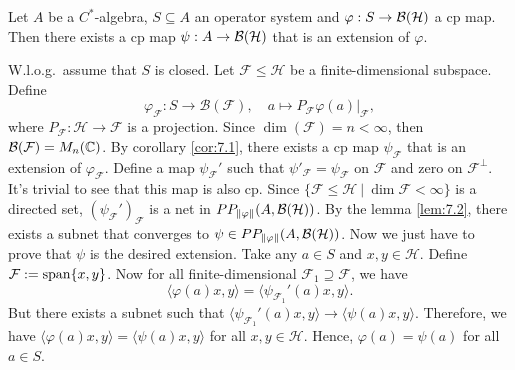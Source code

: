 \begin{theorem}
    Let $A$ be a $C^*$-algebra, $S \subseteq A$ an operator system and $\varphi: S \to \operatorname{\mathcal{B} (\mathcal{H})}$ a cp map.
    Then there exists a cp map $\psi: A \to \operatorname{\mathcal{B} (\mathcal{H})}$ that is an extension of $\varphi$.
\end{theorem}

\begin{myproof}
    W.l.o.g.~assume that $S$ is closed. Let $\mathcal{F} \leq \mathcal{H}$ be a finite-dimensional subspace.
    Define $$\varphi_{\mathcal{F}}: S \to \mathcal{B}(\mathcal{F}),\quad a \mapsto P_{\mathcal{F}} \varphi(a)\big|_{\mathcal{F}},$$
    where $P_\mathcal{F}: \mathcal{H} \to \mathcal{F}$ is a projection.
    Since $\dim (\mathcal{F}) = n < \infty$, then $\mathcal{B} (\mathcal{F}) = M_n (\mathbb {C})$.
    By corollary \ref{cor:7.1}, there exists a cp map $\psi_\mathcal{F}$ that is an extension of $\varphi_{\mathcal{F}}$.
    Define a map $\psi_\mathcal{F} '$ such that $\psi' _\mathcal{F} = \psi_{\mathcal{F}}$ on $\mathcal{F}$ and zero on $\mathcal{F}^\perp$.
    It's trivial to see that this map is also cp.
    Since $\{\mathcal{F} \leq \mathcal{H}\ |\ \dim \mathcal{F} < \infty\}$ is a directed set, $(\psi_\mathcal{F} ')_{\mathcal{F}}$ is a net in $PP_{\| \varphi\|} (A, \operatorname{\mathcal{B} (\mathcal{H})})$.
    By the lemma \ref{lem:7.2}, there exists a subnet that converges to $\psi \in PP_{\| \varphi\|} (A, \operatorname{\mathcal{B} (\mathcal{H})})$.
    Now we just have to prove that $\psi$ is the desired extension.
    Take any $a \in S$ and $x, y \in \mathcal{H}$. Define $\mathcal{F} := \operatorname{span} \{x, y\}$.
    Now for all finite-dimensional $\mathcal{F}_1 \supseteq \mathcal{F}$, we have 
    $$\langle \varphi(a) x, y \rangle = \langle \psi_{\mathcal{F}_1} ' (a) x, y \rangle.$$
    But there exists a subnet such that $\langle \psi_{\mathcal{F}_1} ' (a) x, y \rangle \to \langle \psi(a)x, y \rangle.$
    Therefore, we have $\langle \varphi(a) x, y\rangle = \langle \psi (a)x, y\rangle$ for all $x, y \in \mathcal{H}$.
    Hence, $\varphi(a) = \psi(a)$ for all $a \in S$.
\end{myproof}




